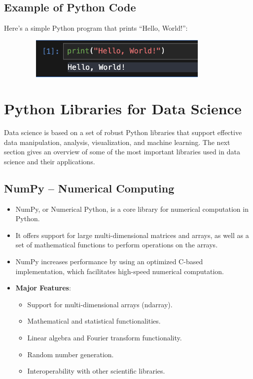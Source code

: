 \documentclass{article}
\begin{document}
\subsection{Example of Python Code}
Here’s a simple Python program that prints “Hello, World!”:

\begin{figure}[htbp]
\centerline{\includegraphics[width=10cm,height=2cm]{Example.png}}
\label{fig}
\end{figure}

\newpage
\section{Python Libraries for Data Science}
Data science is based on a set of robust Python libraries that support effective data manipulation, analysis, visualization, and machine learning. The next section gives an overview of some of the most important libraries used in data science and their applications.
\subsection{NumPy – Numerical Computing}

\begin{itemize}
    \item NumPy, or Numerical Python, is a core library for numerical computation in Python.
    \item It offers support for large multi-dimensional matrices and arrays, as well as a set of mathematical functions to perform operations on the arrays.
    \item  NumPy increases performance by using an optimized C-based implementation, which facilitates high-speed numerical computation.
    \item \textbf{Major Features}:
    \begin{itemize}
    \item Support for multi-dimensional arrays (ndarray).
    \item Mathematical and statistical functionalities.
    \item Linear algebra and Fourier transform functionality.
    \item Random number generation.
    \item Interoperability with other scientific libraries.
    \end{itemize}

\end{itemize}
\end{document}

